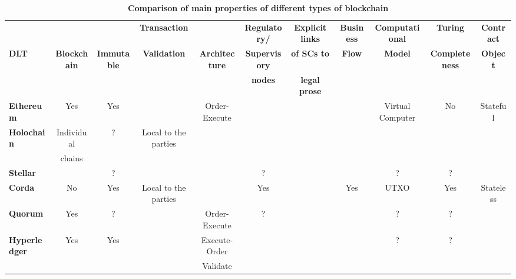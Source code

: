 \begin{table}
\begin{centering}
\vspace{1cm}

{\begin{tabular}{| l | c | c | c | c | c | c | c | c | c | c |}
\hline
				& \textbf{}  			& \textbf{}  			& \textbf{Transaction} 	&
				& \textbf{Regulatory/} 	& \textbf{Explicit links}	&\textbf{Business}
				& \textbf{Computational} 	& \textbf{Turing}		&\textbf{Contract} \\
\textbf{DLT}		& \textbf{Blockchain} 	& \textbf{Immutable} 		& \textbf{Validation} 		& \textbf{Architecture} 
				& \textbf{Supervisory} 	& \textbf{of SCs to}		&\textbf{Flow} 
				& \textbf{Model} 		& \textbf{Completeness}	&\textbf{Object} \\
				& \textbf{} 				& \textbf{} 				& \textbf{} 				&
				& \textbf{nodes} 		& \textbf{legal prose}		&\textbf{} 
				& \textbf{} 				& \textbf{}				&\textbf{} \\
\hline
\hline
\textbf{Ethereum}	&Yes			&Yes		&				&Order-Execute	&
				&			&		&Virtual Computer	&No				&Stateful \\
\hline
\textbf{Holochain}	&Individual	&?		&Local to the parties	&				&
				&			& 		&				&				& \\
				&chains		&		&				&				&
				&			& 		&				&				& \\
\hline
\textbf{Stellar}		&			&?		&				&				&?
				&			& 		&?				&?				&\\
\hline
\textbf{Corda} 		&No			&Yes		&Local to the parties	&				&Yes
				&			&Yes		&UTXO			&Yes				&Stateless\\
\hline
\textbf{Quorum} 	&Yes			&?		&				&Order-Execute	&?
				&			& 		&?				&?				&\\
\hline
\textbf{Hyperledger}	&Yes			&Yes		&				&Execute-Order	&
				&			& 		&?				&?				& \\
 				&			&		&				&Validate			&
				&			& 		&				&				& \\
\hline
\end{tabular}}
\caption{\bf \small Comparison of main properties of different types of blockchain}
\label{blockchain_type}
\end{centering}
\end{table}





